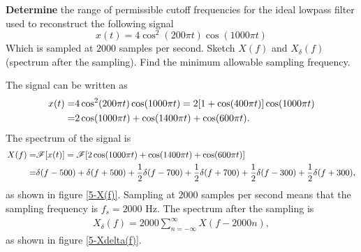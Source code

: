 \documentclass{assignment}
\begin{document}
\begin{prob}[15 pts]
    \textbf{Determine} the range of permissible cutoff frequencies for the ideal lowpass filter used to reconstruct the following signal
    \[
        x(t)=4\cos^2(200\pi t)\cos(1000\pi t)
    \]
    Which is sampled at $2000$ samples per second. Sketch $X(f)$ and $X_{\delta}(f)$ (spectrum after the sampling). Find the minimum allowable sampling frequency.
\end{prob}
\begin{sol}
    The signal can be written as
    \begin{align}
        \notag x(t)=&4\cos^2(200\pi t)\cos(1000\pi t)=2[1+\cos(400\pi t)]\cos(1000\pi t)\\
        =&2\cos(1000\pi t)+\cos(1400\pi t)+\cos(600\pi t).
    \end{align}
    The spectrum of the signal is
    \begin{align}
        \notag X(f)=&\mathscr{F}[x(t)]=\mathscr{F}[2\cos(1000\pi t)+\cos(1400\pi t)+\cos(600\pi t)]\\
        =&\delta(f-500)+\delta(f+500)+\frac{1}{2}\delta(f-700)+\frac{1}{2}\delta(f+700)+\frac{1}{2}\delta(f-300)+\frac{1}{2}\delta(f+300),
    \end{align}
    as shown in figure \ref{5-X(f)}.
    Sampling at $2000$ samples per second means that the sampling frequency is $f_s=2000$ Hz. The spectrum after the sampling is
    \begin{align}
        X_{\delta}(f)=2000\sum_{n=-\infty}^{\infty}X(f-2000n),
    \end{align}
    as shown in figure \ref{5-Xdelta(f)}.
    \begin{figure}[h]
        \centering

\end{figure}
\end{sol}
\end{document}

